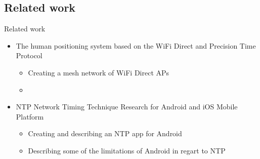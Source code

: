 \subsection{Related work}
\begin{frame}{Related work}

    \begin{itemize}
        \item<1-> The human positioning system based on the WiFi Direct and Precision Time Protocol
        \begin{itemize}
            \item Creating a mesh network of WiFi Direct APs
            \item 
        \end{itemize}
        \item<2-> NTP Network Timing Technique Research for Android and iOS Mobile Platform
        \begin{itemize}
            \item Creating and describing an NTP app for Android
            \item Describing some of the limitations of Android in regart to NTP
        \end{itemize}

    \end{itemize}
\end{frame}


